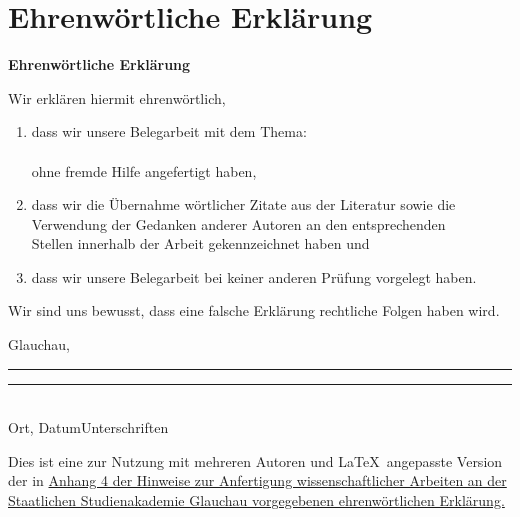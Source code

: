 

\cleardoublepage 
\section{Ehrenwörtliche Erklärung}
\vspace*{1cm}
\begin{center}
\huge\textbf{Ehrenwörtliche Erklärung}\\
\end{center}
\vspace*{1cm}
\normalsize
Wir erklären hiermit ehrenwörtlich,

\begin{enumerate}
	\vspace{1cm}
	\item dass wir unsere Belegarbeit mit dem Thema:\\
	
	\textbf{\titel }\\

	ohne fremde Hilfe angefertigt haben,
	\item dass wir die Übernahme wörtlicher Zitate aus der Literatur sowie die\\ 		  
	Verwendung der Gedanken anderer Autoren an den entsprechenden\\
	Stellen innerhalb der Arbeit gekennzeichnet haben und
	\item dass wir unsere Belegarbeit bei keiner anderen Prüfung vorgelegt haben.\\[1,5cm]
\end{enumerate}
Wir sind uns bewusst, dass eine falsche Erklärung rechtliche Folgen haben wird.\\[1,5cm]
		
\vfill

Glauchau, \abgabedatum\newline\noindent\rule{0.35\columnwidth}{0.4pt}\hspace{0.05\columnwidth}\rule{0.6\columnwidth}{0.4pt}\\
Ort, Datum\hspace{0.27\columnwidth}Unterschriften

{\footnotesize Dies ist eine zur Nutzung mit mehreren Autoren und \LaTeX\ angepasste Version der in \href{https://www.ba-glauchau.de/fileadmin/glauchau/waehrend-des-studium/dokumente/pruefungen/4BA-F.207_Hinweise_zur_Anfertigung_wissenschaftlicher_Arbeiten.pdf}{Anhang 4 der Hinweise zur Anfertigung wissenschaftlicher Arbeiten an der Staatlichen Studienakademie Glauchau vorgegebenen ehrenwörtlichen Erklärung.}}


